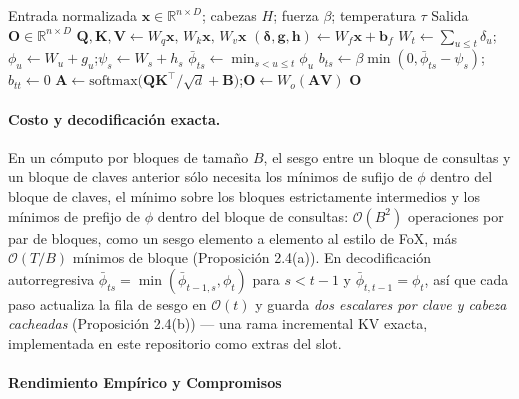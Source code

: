 \begin{algorithm}[H]
\caption{First Passage Attention (Forma Paralela de Referencia)}
\begin{algorithmic}[1]
\Require Entrada normalizada $\mathbf{x}\in\mathbb{R}^{n\times D}$; cabezas $H$; fuerza $\beta$; temperatura $\tau$
\Ensure Salida $\mathbf{O}\in\mathbb{R}^{n\times D}$
\State $\mathbf{Q},\mathbf{K},\mathbf{V}\gets W_q\mathbf{x},\,W_k\mathbf{x},\,W_v\mathbf{x}$ 
\State $(\boldsymbol{\delta},\mathbf{g},\mathbf{h})\gets W_f\mathbf{x}+ \mathbf{b}_f$ 
\State $W_t\gets\sum_{u\le t}\delta_u$;\quad $\phi_u\gets W_u+g_u$;\quad $\psi_s\gets W_s+h_s$
\State $\bar{\phi}_{ts}\gets\min_{s<u\le t}\phi_u$ 
\State $b_{ts}\gets\beta\min(0,\bar{\phi}_{ts}-\psi_s)$;\quad $b_{tt}\gets 0$
\State $\mathbf{A}\gets\mathrm{softmax}\bigl(\mathbf{Q}\mathbf{K}^\top/\sqrt{d}+\mathbf{B}\bigr)$;\quad $\mathbf{O}\gets W_o(\mathbf{A}\mathbf{V})$
\State \Return $\mathbf{O}$ 
\end{algorithmic}
\end{algorithm}

\paragraph{Costo y decodificación exacta.} En un cómputo por bloques de tamaño $B$, el sesgo entre un bloque de consultas y un bloque de claves anterior sólo necesita los mínimos de sufijo de $\phi$ dentro del bloque de claves, el mínimo sobre los bloques estrictamente intermedios y los mínimos de prefijo de $\phi$ dentro del bloque de consultas: $\mathcal{O}(B^2)$ operaciones por par de bloques, como un sesgo elemento a elemento al estilo de FoX, más $\mathcal{O}(T/B)$ mínimos de bloque (Proposición 2.4(a)). En decodificación autorregresiva $\bar{\phi}_{ts}=\min(\bar{\phi}_{t-1,s},\phi_t)$ para $s<t-1$ y $\bar{\phi}_{t,t-1}=\phi_t$, así que cada paso actualiza la fila de sesgo en $\mathcal{O}(t)$ y guarda \emph{dos escalares por clave y cabeza cacheadas} (Proposición 2.4(b)) --- una rama incremental KV exacta, implementada en este repositorio como extras del slot.

\paragraph{Rendimiento Empírico y Compromisos}

